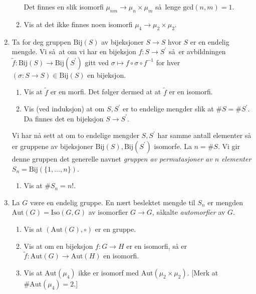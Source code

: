 \begin{enumerate}[resume]
\begin{enumerate}
                Det finnes en slik isomorfi $\mu_{nm}\to \mu_n\times \mu_m$
                så lenge $\mathrm{gcd}(n,m) = 1$.
            \item Vis at det ikke finnes noen isomorfi $\mu_4\to \mu_2\times\mu_2$.
        \end{enumerate}
    \item Ta for deg gruppen $\mathrm{Bij}(S)$ av bijeksjoner $S\to S$
        hvor $S$ er en endelig mengde.
        Vi så at om vi har en bijeksjon $f\colon S\to S^\prime$
        så er avbildningen
        $\tilde f\colon \mathrm{Bij}(S)\to \mathrm{Bij}(S^\prime)$
        gitt ved $\sigma\mapsto f\circ \sigma \circ f^{-1}$
        for hver $(\sigma\colon S\to S)\in\mathrm{Bij}(S)$
        en bijeksjon.
        \begin{enumerate}
            \item Vis at $\tilde f$ er en morfi.
                Det følger dermed at at $\tilde f$ er en isomorfi.
            \item Vis (ved induksjon) at om $S, S^\prime$ er to endelige mengder
                slik at $\# S = \# S^\prime$.
                Da finnes det en bijeksjon $S\to S^\prime$.
        \end{enumerate}
        Vi har nå sett at om to endelige mengder $S, S^\prime$
        har samme antall elementer så er gruppene av bijeksjoner
        $\mathrm{Bij}(S), \mathrm{Bij}(S^\prime)$ isomorfe.
        La $n = \# S$.
        Vi gir denne gruppen det generelle navnet
        \textit{gruppen av permutasjoner av $n$ elementer}
        $S_n = \mathrm{Bij}(\{1,\dots,n\})$.
        \begin{enumerate}[resume]
            \item Vis at $\# S_n = n!$.
        \end{enumerate}
    \item La $G$ være en endelig gruppe.
        En nært beslektet mengde til $S_n$ er mengden
        $\mathrm{Aut}(G) = \mathrm{Iso}(G, G)$
        av isomorfier $G\to G$, såkalte \textit{automorfier} av $G$.
        \begin{enumerate}
            \item Vis at $(\mathrm{Aut}(G), \circ)$ er en gruppe.
            \item Vis at om en bijeksjon $f\colon G\to H$ er en isomorfi,
                så er $\tilde f\colon \mathrm{Aut}(G)\to \mathrm{Aut}(H)$
                en isomorfi.
            \item Vis at $\mathrm{Aut}(\mu_4)$ ikke er isomorf
                med $\mathrm{Aut}(\mu_2\times\mu_2)$.
                [Merk at $\#\mathrm{Aut}(\mu_4) = 2$.]
        \end{enumerate}
\end{enumerate}

